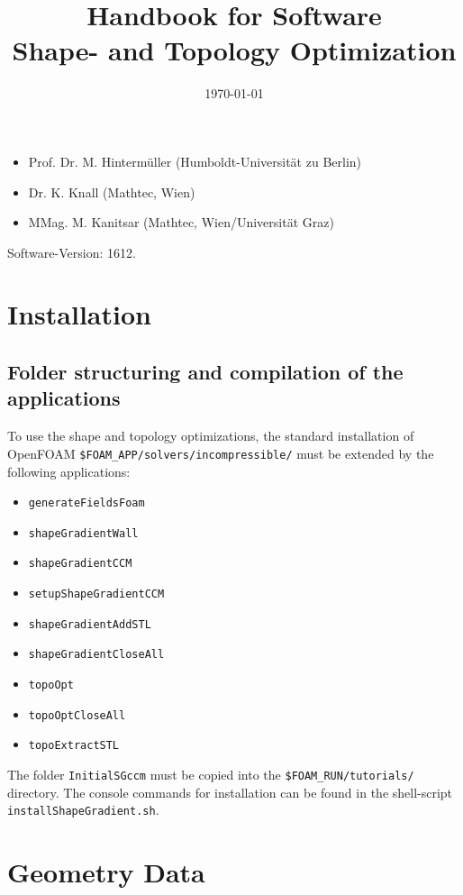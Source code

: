 \documentclass[oneside]{article}
\title{Handbook for Software\\
Shape- and Topology Optimization}
\date{\today}
\numberwithin{equation}{section}
\numberwithin{figure}{section}
\numberwithin{figure}{section}
\begin{document}
\maketitle
\begin{itemize}
    \item Prof. Dr. M. Hintermüller (Humboldt-Universität zu Berlin)
    \item Dr. K. Knall (Mathtec, Wien)
    \item MMag. M. Kanitsar (Mathtec, Wien/Universität Graz)
\end{itemize}
Software-Version: 1612.
\setcounter{secnumdepth}{6}
\setcounter{tocdepth}{6}
\tableofcontents

\section{Installation}

\subsection{Folder structuring and compilation of the applications}
To use the shape and topology optimizations, the standard installation of OpenFOAM \verb|$FOAM_APP/solvers/incompressible/| must be extended by the following applications:
\begin{itemize}
    \item \texttt{generateFieldsFoam}
    \item \texttt{shapeGradientWall}
    \item \texttt{shapeGradientCCM}
    \item \texttt{setupShapeGradientCCM}
    \item \texttt{shapeGradientAddSTL}
    \item \texttt{shapeGradientCloseAll}
    \item \texttt{topoOpt}
    \item \texttt{topoOptCloseAll}
    \item \texttt{topoExtractSTL}
\end{itemize}
The folder \texttt{InitialSGccm} must be copied into the \verb|$FOAM_RUN/tutorials/| directory. The console commands for installation can be found in the shell-script \texttt{installShapeGradient.sh}.


\section{Geometry Data}
\end{document}
